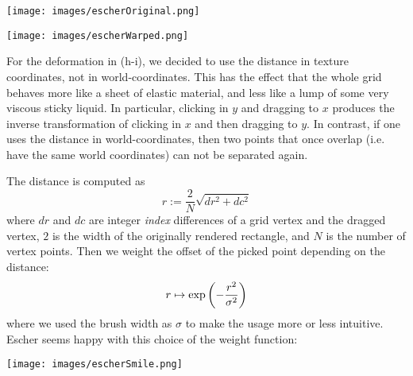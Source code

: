 \documentclass{scrartcl}
\begin{document}
\begin{minipage}[t]{0.45\linewidth}
  \centering\texttt{[image: images/escherOriginal.png]}
  \label{originalEscher}
\end{minipage}
\hspace{0.1\linewidth}
\begin{minipage}[t]{0.45\linewidth}
  \centering\texttt{[image: images/escherWarped.png]}
  \label{warpedEscher}
\end{minipage}

For the deformation in (h-i), we decided to use the distance in texture coordinates,
not in world-coordinates. 
This has the effect that the whole grid behaves more like a sheet of elastic
material, and less like a lump of some very viscous sticky liquid. 
In particular, clicking in $y$ and
dragging to $x$ produces the inverse transformation of clicking in $x$ and then 
dragging to $y$. In contrast, if one uses the distance in world-coordinates, then two
points that once overlap (i.e. have the same world coordinates) can not be separated again.

The distance is computed as
\[
  r := \frac{2}{N} \sqrt{dr^2 + dc^2}  
\]
where $dr$ and $dc$ are integer \emph{index} differences of a grid vertex and the dragged vertex, 
$2$ is the width of the originally rendered rectangle, and $N$ is the number of vertex points.
Then we weight the offset of the picked point depending on the distance:
\[
  r \mapsto \exp\left({-\frac{r^2}{\sigma^2}}\right)
\]
where we used the brush width as $\sigma$ to make the usage more or less intuitive.
Escher seems happy with this choice of the weight function:

\centering\texttt{[image: images/escherSmile.png]}
\end{document}
